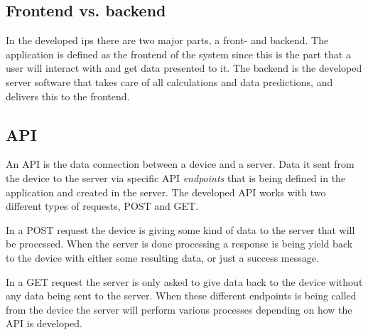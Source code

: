 \subsection{Frontend vs. backend}\label{sec:implArchitectureFrontBack}
In the developed \acrshort{ips} there are two major parts, a front- and backend.
The application is defined as the frontend of the system since this is the part that a user will interact with and get data presented to it. 
The backend is the developed server software that takes care of all calculations and data predictions, and delivers this to the frontend.


\subsection{API}\label{sec:implArchitectureApi}
An API is the data connection between a device and a server.
Data it sent from the device to the server via specific API \textit{endpoints} that is being defined in the application and created in the server.
The developed API works with two different types of requests, POST and GET.

\bigskip

In a POST request the device is giving some kind of data to the server that will be processed.
When the server is done processing a response is being yield back to the device with either some resulting data, or just a success message.

\bigskip

In a GET request the server is only asked to give data back to the device without any data being sent to the server.
When these different endpoints is being called from the device the server will perform various processes depending on how the API is developed.

